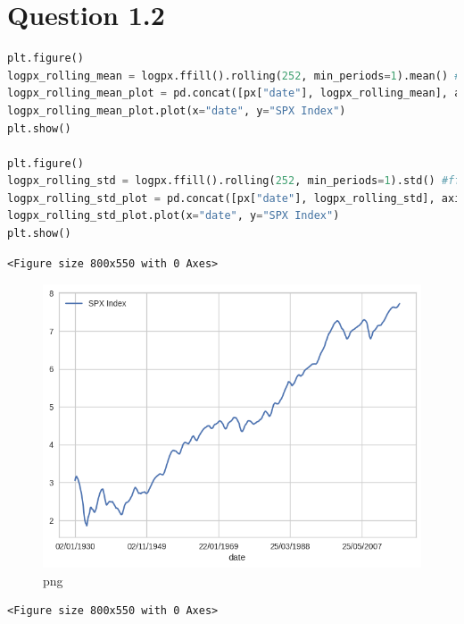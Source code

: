 \hypertarget{question-1.2}{%
\section{Question 1.2}\label{question-1.2}}

\begin{lstlisting}[language=Python]
plt.figure()
logpx_rolling_mean = logpx.ffill().rolling(252, min_periods=1).mean() #ffill to fill the missing values and min periods 1 to take the first 251 values without rolling
logpx_rolling_mean_plot = pd.concat([px["date"], logpx_rolling_mean], axis=1)
logpx_rolling_mean_plot.plot(x="date", y="SPX Index")
plt.show()

plt.figure()
logpx_rolling_std = logpx.ffill().rolling(252, min_periods=1).std() #ffill to fill the missing values and min periods 1 to take the first 251 values without rolling
logpx_rolling_std_plot = pd.concat([px["date"], logpx_rolling_std], axis=1)
logpx_rolling_std_plot.plot(x="date", y="SPX Index")
plt.show()
\end{lstlisting}

\begin{lstlisting}
<Figure size 800x550 with 0 Axes>
\end{lstlisting}

\begin{figure}
\centering
\includegraphics{ProcessingStockPriceData_files/ProcessingStockPriceData_5_1.png}
\caption{png}
\end{figure}

\begin{lstlisting}
<Figure size 800x550 with 0 Axes>
\end{lstlisting}

